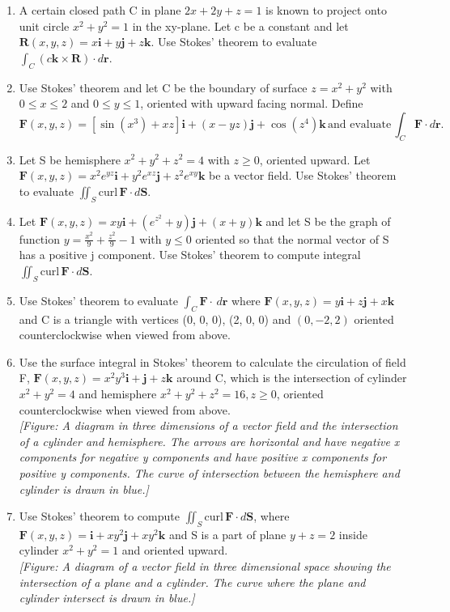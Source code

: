 \documentclass{exercises}
\begin{document}
\begin{enumerate}[resume]
\item A certain closed path C in plane $2x+2y+z=1$ is known to project onto unit circle $x^{2}+y^{2}=1$ in the xy-plane. Let c be a constant and let $\mathbf{R}(x,y,z)=x\mathbf{i}+y\mathbf{j}+z\mathbf{k}$. Use Stokes' theorem to evaluate $\int_{C}^{}(c\mathbf{k}\times \mathbf{R})\cdot d\mathbf{r}$.
\item Use Stokes' theorem and let C be the boundary of surface $z=x^{2}+y^{2}$ with $0\le x\le2$ and $0\le y\le1$, oriented with upward facing normal. Define \[\mathbf{F}(x,y,z)=[\sin(x^{3})+xz]\mathbf{i}+(x-yz)\mathbf{j}+\cos(z^{4})\mathbf{k}\,\text{and evaluate}\,\int_{C}\mathbf{F}\cdot d\mathbf{r}.\]
\item Let S be hemisphere $x^{2}+y^{2}+z^{2}=4$ with $z\ge0$, oriented upward. Let $\mathbf{F}(x,y,z)=x^{2}e^{yz}\mathbf{i}+y^{2}e^{xz}\mathbf{j}+z^{2}e^{xy}\mathbf{k}$ be a vector field. Use Stokes' theorem to evaluate $\iint_{S}\text{curl}\,\mathbf{F}\cdot d\mathbf{S}$.
\item Let $\mathbf{F}(x,y,z)=xy\mathbf{i}+(e^{z^{2}}+y)\mathbf{j}+(x+y)\mathbf{k}$ and let S be the graph of function $y=\frac{x^{2}}{9}+\frac{z^{2}}{9}-1$ with $y\le0$ oriented so that the normal vector of S has a positive j component. Use Stokes' theorem to compute integral $\iint_{S}\text{curl}\,\mathbf{F}\cdot d\mathbf{S}$.
\item Use Stokes' theorem to evaluate $\int_{C}\mathbf{F}\cdot \,d\mathbf{r}$ where $\mathbf{F}(x,y,z)=y\mathbf{i}+z\mathbf{j}+x\mathbf{k}$ and C is a triangle with vertices (0, 0, 0), (2, 0, 0) and $(0,-2,2)$ oriented counterclockwise when viewed from above.
\item Use the surface integral in Stokes' theorem to calculate the circulation of field F, $\mathbf{F}(x,y,z)=x^{2}y^{3}\mathbf{i}+\mathbf{j}+z\mathbf{k}$ around C, which is the intersection of cylinder $x^{2}+y^{2}=4$ and hemisphere $x^{2}+y^{2}+z^{2}=16,z\ge0$, oriented counterclockwise when viewed from above. \\ \textit{[Figure: A diagram in three dimensions of a vector field and the intersection of a cylinder and hemisphere. The arrows are horizontal and have negative x components for negative y components and have positive x components for positive y components. The curve of intersection between the hemisphere and cylinder is drawn in blue.]}
\item Use Stokes' theorem to compute $\iint_{S}\text{curl}\,\mathbf{F}\cdot d\mathbf{S}$, where $\mathbf{F}(x,y,z)=\mathbf{i}+xy^{2}\mathbf{j}+xy^{2}\mathbf{k}$ and S is a part of plane $y+z=2$ inside cylinder $x^{2}+y^{2}=1$ and oriented upward. \\ \textit{[Figure: A diagram of a vector field in three dimensional space showing the intersection of a plane and a cylinder. The curve where the plane and cylinder intersect is drawn in blue.]}

\end{enumerate}
\end{document}
